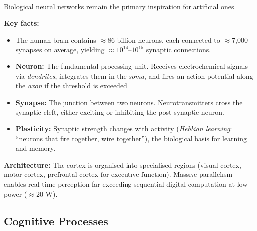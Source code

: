     \begin{tcbitemize}[ skin=sectionraster ]
        \tcbitem[title={The Human Brain: Structure and Scale}, raster multicolumn=6]
        Biological neural networks remain the primary inspiration for artificial ones\textsuperscript{\cite[][p.~13]{Kriesel2007NeuralNetworks}}

        \textbf{Key facts:}
        \begin{itemize}
            \item The human brain contains $\approx$86 billion neurons, each connected to $\approx$7{,}000 synapses on average, yielding $\approx 10^{14}$--$10^{15}$ synaptic connections.
            \item \textbf{Neuron:} The fundamental processing unit. Receives electrochemical signals via \emph{dendrites}, integrates them in the \emph{soma}, and fires an action potential along the \emph{axon} if the threshold is exceeded.
            \item \textbf{Synapse:} The junction between two neurons. Neurotransmitters cross the synaptic cleft, either exciting or inhibiting the post-synaptic neuron.
            \item \textbf{Plasticity:} Synaptic strength changes with activity (\emph{Hebbian learning}: ``neurons that fire together, wire together''), the biological basis for learning and memory.
        \end{itemize}

        \textbf{Architecture:} The cortex is organised into specialised regions (visual cortex, motor cortex, prefrontal cortex for executive function). Massive parallelism enables real-time perception far exceeding sequential digital computation at low power ($\approx$20 W).
    \end{tcbitemize}

    \subsection{Cognitive Processes}

